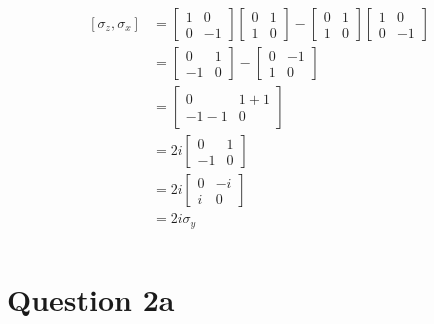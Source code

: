 \documentclass{article}
\begin{document}
\begin{align*}
    \begin{split}
    [\sigma_z, \sigma_x] &=
    \begin{bmatrix}
        1 & 0 \\
        0 & -1
    \end{bmatrix}
    \begin{bmatrix}
        0 & 1 \\
        1 & 0
    \end{bmatrix}
    - \begin{bmatrix}
        0 & 1 \\
        1 & 0
    \end{bmatrix}
    \begin{bmatrix}
        1 & 0 \\
        0 & -1
    \end{bmatrix} \\
    &= 
    \begin{bmatrix}
        0 & 1 \\
        -1 & 0
    \end{bmatrix}
    - \begin{bmatrix}
        0 & -1\\
        1 & 0
    \end{bmatrix} \\
    &= \begin{bmatrix}
        0 & 1 + 1 \\
        -1 - 1 & 0
    \end{bmatrix} \\
    &= 2i \begin{bmatrix}
        0 & 1 \\
        -1 & 0
    \end{bmatrix} \\
    &= 2i \begin{bmatrix}
        0 & -i \\   
        i & 0
    \end{bmatrix} \\
    &= 2i\sigma_y \\
    \end{split}
\end{align*}

\newpage

\section*{Question 2a}
\end{document}
